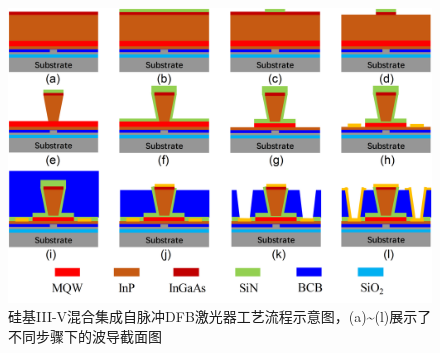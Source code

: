 \begin{enumerate}[(1)]
	\begin{figure}[htb]
		\centering
		\includegraphics[width=15cm]{./Pictures/laser_fab.jpg}
		\captionsetup{justification=centering}
		\caption{硅基III-V混合集成自脉冲DFB激光器工艺流程示意图，(a)\~{}(l)展示了不同步骤下的波导截面图}
		\label{laser_fab}
	\end{figure}


\end{enumerate}
